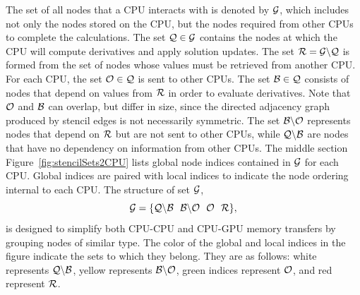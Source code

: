 The set of all nodes that a CPU interacts with is denoted by $\mathcal{G}$, which includes not only the nodes stored on the CPU, but the nodes required from other CPUs to complete the calculations. 
The set $\mathcal{Q}\in\mathcal{G}$ contains the nodes at which the CPU 
will compute derivatives and apply solution updates. 
The set $\mathcal{R} = \mathcal{G} \backslash \mathcal{Q}$ 
is formed from the set of nodes whose values must be retrieved from another CPU. 
For each CPU, the set $\mathcal{O}\in\mathcal{Q}$ is sent to other CPUs. The set $\mathcal{B}\in\mathcal{Q}$ consists of nodes that depend on  values from $\mathcal{R}$ in order to evaluate derivatives. Note that $\mathcal{O}$ and $\mathcal{B}$ can overlap, but differ in size, since the directed adjacency graph produced by stencil edges is not necessarily symmetric. The set $\mathcal{B} \backslash \mathcal{O}$ represents nodes that depend on $\mathcal{R}$ but are not sent to other CPUs, while $\mathcal{Q} \backslash \mathcal{B}$ are nodes that have no dependency on information from other CPUs.
The middle section Figure~\ref{fig:stencilSets2CPU} lists global node indices contained in $\mathcal{G}$ for each CPU. Global indices are paired with local indices to indicate the node ordering internal to each CPU. The structure of set $\mathcal{G}$,
   \begin{equation}
 		\setAllNodes = \{ \mathcal{Q}\backslash\mathcal{B} \ \ \mathcal{B}\backslash\mathcal{O} \ \ \mathcal{O} \ \ \setDepend \},
            \label{eqn:decompose_g}
        \end{equation}
 is designed to simplify both CPU-CPU and CPU-GPU memory transfers by grouping nodes of similar type. The color of the global and local indices in the figure
 indicate the sets to which they belong. They are as follows: white represents $\mathcal{Q} \backslash \mathcal{B}$, 
 yellow represents $\mathcal{B} \backslash \mathcal{O}$, green indices 
 represent $\mathcal{O}$, and red represent $\mathcal{R}$.  


